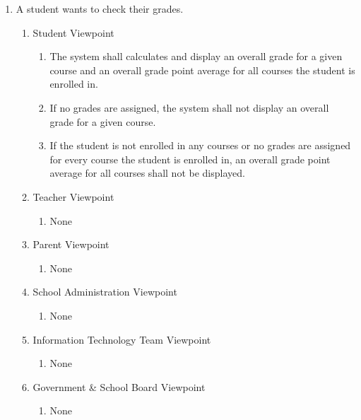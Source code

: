 \documentclass[]{article}
\begin{document}
\begin{enumerate}[{BE}1.]
  \item A student wants to check their grades.
	\begin{enumerate}[{VP2}.1]
		\item Student Viewpoint
			\begin{enumerate}
        \item The system shall calculates and display an overall grade for a
          given course and an overall grade point average for all courses the
          student is enrolled in.
        \item If no grades are assigned, the system shall not display an
          overall grade for a given course.
        \item If the student is not enrolled in any courses or no grades are
          assigned for every course the student is enrolled in, an overall
          grade point average for all courses shall not be displayed.
			\end{enumerate}
		\item Teacher Viewpoint
			\begin{enumerate}
				\item None
			\end{enumerate}
		\item Parent Viewpoint
			\begin{enumerate}
				\item None
			\end{enumerate}
		\item School Administration Viewpoint
			\begin{enumerate}
				\item None
			\end{enumerate}
		\item Information Technology Team Viewpoint
			\begin{enumerate}
				\item None
			\end{enumerate}
		\item Government \& School Board Viewpoint
			\begin{enumerate}
				\item None
			\end{enumerate}
	\end{enumerate}


\end{enumerate}
\end{document}
